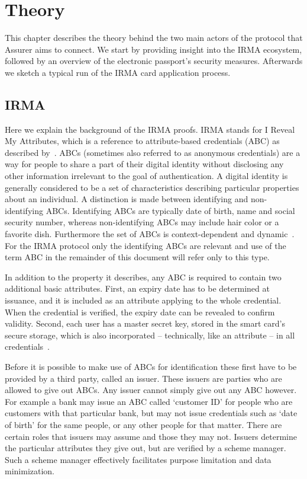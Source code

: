 \chapter{Theory}
\label{sec:theory}
This chapter describes the theory behind the two main actors of the protocol that Assurer aims to connect. We start by providing insight into the IRMA ecosystem, followed by an overview of the electronic passport's security measures. Afterwards we sketch a typical run of the IRMA card application process.

\section{IRMA}
Here we explain the background of the IRMA proofs. IRMA stands for I Reveal My Attributes, which is a reference to attribute-based credentials (ABC) as described by~\cite{zeroknowledgeprotocols,abcfortrust,alpar2013credential}. ABCs (sometimes also referred to as anonymous credentials) are a way for people to share a part of their digital identity without disclosing any other information irrelevant to the goal of authentication. A digital identity is generally considered to be a set of characteristics describing particular properties about an individual. A distinction is made between identifying and non-identifying ABCs. Identifying ABCs are typically date of birth, name and social security number, whereas non-identifying ABCs may include hair color or a favorite dish. Furthermore the set of ABCs is context-dependent and dynamic~\cite{abcofabc}. For the IRMA protocol only the identifying ABCs are relevant and use of the term ABC in the remainder of this document will refer only to this type.

In addition to the property it describes, any ABC is required to contain two additional basic attributes. First, an expiry date has to be determined at issuance, and it is included as an attribute applying to the whole credential. When the credential is verified, the expiry date can be revealed to confirm validity. Second, each user has a master secret key, stored in the smart card's secure storage, which is also incorporated -- technically, like an attribute -- in all credentials~\cite{alpar2013credential}.

Before it is possible to make use of ABCs for identification these first have to be provided by a third party, called an issuer. These issuers are parties who are allowed to give out ABCs. Any issuer cannot simply give out any ABC however. For example a bank may issue an ABC called `customer ID' for people who are customers with that particular bank, but may not issue credentials such as `date of birth' for the same people, or any other people for that matter. There are certain roles that issuers may assume and those they may not. Issuers determine the particular attributes they give out, but are verified by a scheme manager. Such a scheme manager effectively facilitates purpose limitation and data minimization.

